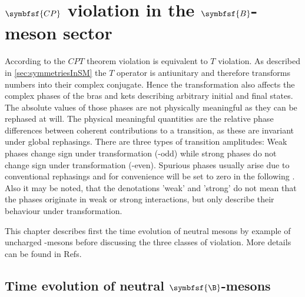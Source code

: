 \chapter[head={\CP violation in the $B$-meson sector},tocentry={$\symbfsf{C{}P}$ violation in the $\symbfsf{B}$-meson sector}]
{$\symbfsf{C{}P}$ violation in the $\symbfsf{B}$-meson sector}
\label{chap:CPV}

According to the $CPT$ theorem \CP violation is equivalent to $T$ violation. As described in \cref{sec:symmetriesInSM} the $T$ operator
is antiunitary and therefore transforms numbers into their complex conjugate.
Hence the \CP transformation also affects the complex phases of the bras and kets describing arbitrary initial and final states.
The absolute values of those phases are not physically meaningful as they can be rephased at will.
The physical meaningful quantities are the relative phase differences between coherent contributions to a transition, as these are invariant under global rephasings.
There are three types of transition amplitudes: Weak phases change sign under \CP transformation (\CP-odd) while strong phases do not change sign under \CP transformation (\CP-even).
Spurious phases usually arise due to conventional rephasings and for convenience will be set to zero in the following .
Also it may be noted, that the denotations 'weak' and 'strong' do not mean that the phases originate in weak or strong interactions, but only describe their behaviour under \CP transformation.

This chapter describes first the time evolution of neutral mesons by example of uncharged \B-mesons before discussing the three classes of \CP violation.
More details can be found in Refs.~\cite{Branco:396964,Bigi:1295518}


\section[head={Time evolution of neutral \B-mesons},tocentry={Time evolution of neutral $\symbfsf{\B}$-mesons}]{Time evolution of neutral $\symbfsf{\B}$-mesons}
\label{sec:TimeEvolution}

